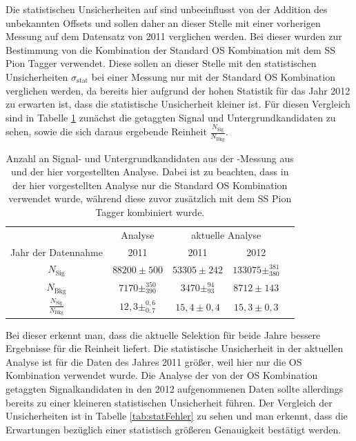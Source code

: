 Die statistischen Unsicherheiten auf \dmd sind unbeeinflusst von der Addition des unbekannten Offsets und sollen daher an dieser Stelle mit einer vorherigen Messung  auf dem Datensatz von \num{2011} \cite{dmd_messung} verglichen werden. Bei dieser wurden zur Bestimmung von \dmd die Kombination der Standard OS Kombination mit dem SS Pion Tagger verwendet. Diese sollen an dieser Stelle mit den statistischen Unsicherheiten $\sigma_\text{stat}$ bei einer Messung nur mit der Standard OS Kombination verglichen werden, da bereits hier aufgrund der hohen Statistik für das Jahr \num{2012} zu erwarten ist, dass die statistische Unsicherheit kleiner ist. Für diesen Vergleich sind in Tabelle \ref{tab:Reinheit} zunächst die getaggten Signal und Untergrundkandidaten zu sehen, sowie die sich daraus ergebende Reinheit $\frac{N_\text{Sig}}{N_\text{Bkg}}$.
\begin{table}[htbp]
	\centering
	\caption{Anzahl an Signal- und Untergrundkandidaten aus der \dmd-Messung aus \cite{dmd_messung} und der hier vorgestellten Analyse. Dabei ist zu beachten, dass in der hier vorgestellten Analyse nur die Standard OS Kombination verwendet wurde, während diese zuvor zusätzlich mit dem SS Pion Tagger kombiniert wurde.}
	\label{tab:Reinheit}
	\begin{tabular}{ccccc}
	\toprule
         			&\lhcb Analyse & \multicolumn{2}{c}{aktuelle Analyse} \\  
        Jahr der Datennahme & \num{2011}	 & \num{2011} & \num{2012} \\ 
        \midrule
       $N_\text{Sig}$	& $88200\pm500$ & $53305\pm242$ & $133075\pm^{381}_{380}$ \\ 
       $N_\text{Bkg}$	& $7170\pm^{350}_{390}$& $3470\pm^{94}_{93}$ & $8712\pm143$ \\ 
       \midrule
       $\frac{N_\text{Sig}}{N_\text{Bkg}}$ & $12{,}3\pm^{0{,}6}_{0{,}7}$ & $15{,}4\pm0{,}4$ & $15{,}3\pm0{,}3$  \\ 
       \bottomrule
	\end{tabular}
\end{table}
Bei dieser erkennt man, dass die aktuelle Selektion für beide Jahre bessere Ergebnisse für die Reinheit liefert. Die statistische Unsicherheit in der aktuellen Analyse ist für die Daten des Jahres \num{2011} größer, weil hier nur die OS Kombination verwendet wurde. Die Analyse der von der OS Kombination getaggten Signalkandidaten in den \num{2012} aufgenommenen Daten sollte allerdings bereits zu einer kleineren statistischen Unsicherheit führen. Der Vergleich der Unsicherheiten ist in Tabelle \ref{tab:statFehler} zu sehen und man erkennt, dass die Erwartungen bezüglich einer statistisch größeren Genauigkeit bestätigt werden.
